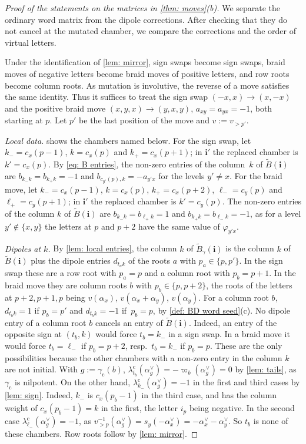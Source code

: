 \documentclass[a4paper]{amsart}
\numberwithin{equation}{section}
\theoremstyle{definition}
\theoremstyle{remark}
\newcommand{\bfi}{\mathbf{i}}
\newcommand{\tB}{\widetilde{B}}
\newcommand{\cc}{\mathrm{c}}
\begin{document}
\begin{proof}[Proof of the statements on the matrices in \cref{thm: moves}(b)]
  We separate the ordinary word matrix from the dipole corrections.
  After checking that they do not cancel at the mutated chamber, we compare the corrections and the order of virtual letters.

  Under the identification of \cref{lem: mirror}, sign swaps become sign swaps, braid moves of negative letters become braid moves of positive letters, and row roots become column roots.
  As mutation is involutive, the reverse of a move satisfies the same identity.
  Thus it suffices to treat the sign swap $(-x,x)\to(x,-x)$ and the positive braid move $(x,y,x)\to(y,x,y)$, $a_{xy}=a_{yx}=-1$, both starting at $p$.
  Let $p'$ be the last position of the move and $v:=v_{>p'}$.

  \emph{Local data.}  shows the chambers named below.
  For the sign swap, let $k_-=c_x(p-1)$, $k=c_x(p)$ and $k_+=c_x(p+1)$; in $\bfi'$ the replaced chamber is $k'=c_x(p)$.
  By \eqref{eq: B entries}, the non-zero entries of the column~$k$ of $\tB(\bfi)$ are $b_{k_-k}=b_{k_+k}=-1$ and $b_{c_{y'}(p),k}=-a_{y'x}$ for the levels $y'\neq x$.
  For the braid move, let $k_-=c_x(p-1)$, $k=c_x(p)$, $k_+=c_x(p+2)$, $\ell_-=c_y(p)$ and $\ell_+=c_y(p+1)$; in $\bfi'$ the replaced chamber is $k'=c_y(p)$.
  The non-zero entries of the column $k$ of $\tB(\bfi)$ are $b_{k_-k}=b_{\ell_+k}=1$ and $b_{k_+k}=b_{\ell_-k}=-1$, as for a level $y'\notin\{x,y\}$ the letters at $p$ and $p+2$ have the same value of $\varphi_{y'x}$.

  \emph{Dipoles at $k$.} By \cref{lem: local entries}, the column $k$ of $\tB_\gamma(\bfi)$ is the column $k$ of $\tB(\bfi)$ plus the dipole entries $d_{t_ak}$ of the roots $a$ with $p_a\in\{p,p'\}$.
  In the sign swap these are a row root with $p_a=p$ and a column root with $p_b=p+1$.
  In the braid move they are column roots $b$ with $p_b\in\{p,p+2\}$, the roots of the letters at $p+2,p+1,p$ being $v(\alpha_x)$, $v(\alpha_x+\alpha_y)$, $v(\alpha_y)$.
  For a column root $b$, $d_{t_bk}=1$ if $p_b=p'$ and $d_{t_bk}=-1$ if~$p_b=p$, by \cref{def: BD word seed}(c).
  No dipole entry of a column root $b$ cancels an entry of $\tB(\bfi)$.
  Indeed, an entry of the opposite sign at $(t_b,k)$ would force $t_b=k_-$ in a sign swap.
  In a braid move it would force $t_b=\ell_-$ if $p_b=p+2$, resp.\ $t_b=k_-$ if $p_b=p$.
  These are the only possibilities because the other chambers with a non-zero entry in the column $k$ are not initial.
  With $g:=\gamma_{\cc}(b)$, $\lambda^\cc_{t_b}(\alpha_g^\vee)=-\varpi_b(\alpha_g^\vee)=0$ by \cref{lem: tails}, as $\gamma_{\cc}$ is nilpotent.
  On the other hand, $\lambda^\cc_{k_-}(\alpha_g^\vee)=-1$ in the first and third cases by \cref{lem: sign}.
  Indeed, $k_-$ is $c_x(p_b-1)$ in the third case, and has the column weight of $c_x(p_b-1)=k$ in the first, the letter $i_p$ being negative.
  In the second case $\lambda^\cc_{\ell_-}(\alpha_g^\vee)=-1$, as $v_{>p}^{-1}(\alpha_g^\vee)=s_y(-\alpha_x^\vee)=-\alpha_x^\vee-\alpha_y^\vee$.
  So $t_b$ is none of these chambers.
  Row roots follow by \cref{lem: mirror}.


\end{proof}
\end{document}
